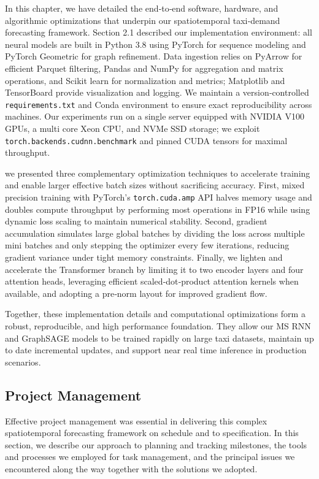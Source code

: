 \documentclass{article}
\begin{document}
In this chapter, we have detailed the end‐to‐end software, hardware, and algorithmic optimizations that underpin our spatiotemporal taxi‐demand forecasting framework.  Section 2.1 described our implementation environment: all neural models are built in Python 3.8 using PyTorch for sequence modeling and PyTorch Geometric for graph refinement.  Data ingestion relies on PyArrow for efficient Parquet filtering, Pandas and NumPy for aggregation and matrix operations, and Scikit learn for normalization and metrics; Matplotlib and TensorBoard provide visualization and logging.  We maintain a version‐controlled \texttt{requirements.txt} and Conda environment to ensure exact reproducibility across machines.  Our experiments run on a single server equipped with NVIDIA V100 GPUs, a multi core Xeon CPU, and NVMe SSD storage; we exploit \texttt{torch.backends.cudnn.benchmark} and pinned CUDA tensors for maximal throughput.

we presented three complementary optimization techniques to accelerate training and enable larger effective batch sizes without sacrificing accuracy.  First, mixed precision training with PyTorch’s \texttt{torch.cuda.amp} API halves memory usage and doubles compute throughput by performing most operations in FP16 while using dynamic loss scaling to maintain numerical stability.  Second, gradient accumulation simulates large global batches by dividing the loss across multiple mini batches and only stepping the optimizer every few iterations, reducing gradient variance under tight memory constraints.  Finally, we lighten and accelerate the Transformer branch by limiting it to two encoder layers and four attention heads, leveraging efficient scaled‐dot‐product attention kernels when available, and adopting a pre‐norm layout for improved gradient flow.  

Together, these implementation details and computational optimizations form a robust, reproducible, and high performance foundation.  They allow our MS RNN and GraphSAGE models to be trained rapidly on large taxi datasets, maintain up to date incremental updates, and support near real time inference in production scenarios.  


\subsection{Project Management}

Effective project management was essential in delivering this complex spatiotemporal forecasting framework on schedule and to specification. In this section, we describe our approach to planning and tracking milestones, the tools and processes we employed for task management, and the principal issues we encountered along the way together with the solutions we adopted.
\end{document}
